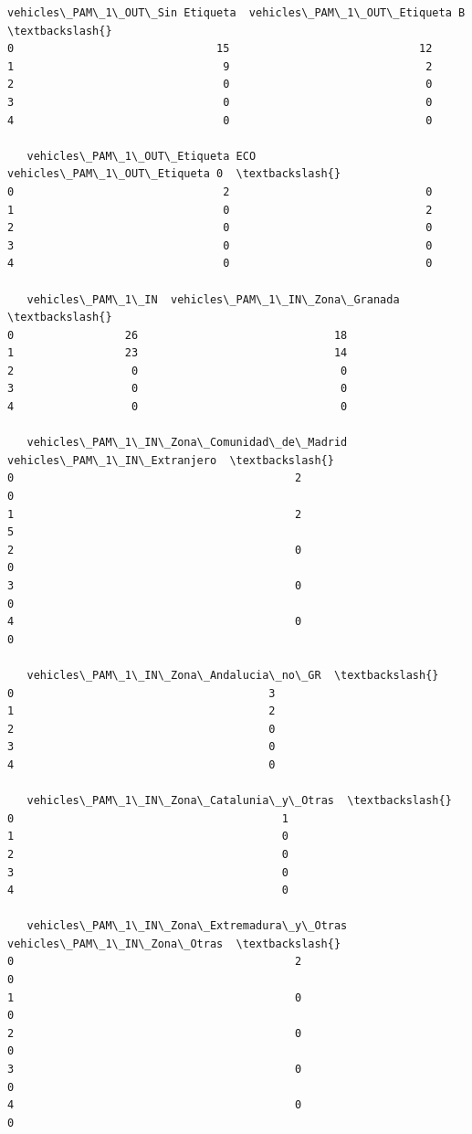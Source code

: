 \documentclass[11pt]{article}
\begin{document}
\begin{tcolorbox}[breakable, size=fbox, boxrule=.5pt, pad at break*=1mm, opacityfill=0]
\begin{Verbatim}[commandchars=\\\{\}]
   vehicles\_PAM\_1\_OUT\_Sin Etiqueta  vehicles\_PAM\_1\_OUT\_Etiqueta B  \textbackslash{}
0                               15                             12
1                                9                              2
2                                0                              0
3                                0                              0
4                                0                              0

   vehicles\_PAM\_1\_OUT\_Etiqueta ECO  vehicles\_PAM\_1\_OUT\_Etiqueta 0  \textbackslash{}
0                                2                              0
1                                0                              2
2                                0                              0
3                                0                              0
4                                0                              0

   vehicles\_PAM\_1\_IN  vehicles\_PAM\_1\_IN\_Zona\_Granada  \textbackslash{}
0                 26                              18
1                 23                              14
2                  0                               0
3                  0                               0
4                  0                               0

   vehicles\_PAM\_1\_IN\_Zona\_Comunidad\_de\_Madrid  vehicles\_PAM\_1\_IN\_Extranjero  \textbackslash{}
0                                           2                             0
1                                           2                             5
2                                           0                             0
3                                           0                             0
4                                           0                             0

   vehicles\_PAM\_1\_IN\_Zona\_Andalucia\_no\_GR  \textbackslash{}
0                                       3
1                                       2
2                                       0
3                                       0
4                                       0

   vehicles\_PAM\_1\_IN\_Zona\_Catalunia\_y\_Otras  \textbackslash{}
0                                         1
1                                         0
2                                         0
3                                         0
4                                         0

   vehicles\_PAM\_1\_IN\_Zona\_Extremadura\_y\_Otras  vehicles\_PAM\_1\_IN\_Zona\_Otras  \textbackslash{}
0                                           2                             0
1                                           0                             0
2                                           0                             0
3                                           0                             0
4                                           0                             0


\end{Verbatim}
\end{tcolorbox}
\end{document}

